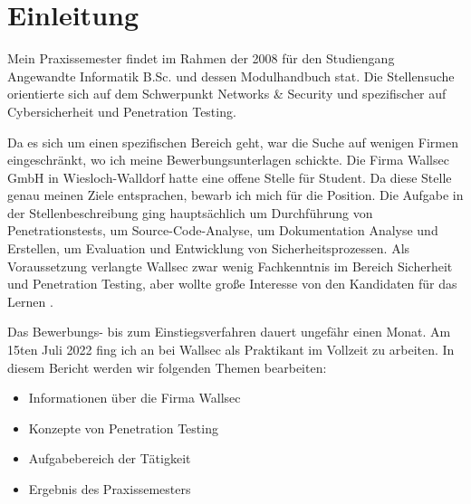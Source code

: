 \section{Einleitung}


Mein Praxissemester findet im Rahmen der  2008 für den Studiengang Angewandte Informatik B.Sc. und dessen Modulhandbuch \citep{Hochschule_Worms_FPO} stat. Die Stellensuche orientierte sich auf dem Schwerpunkt Networks \& Security und spezifischer auf Cybersicherheit und Penetration Testing. 

Da es sich um einen spezifischen Bereich geht, war die Suche auf wenigen Firmen eingeschränkt, wo ich meine Bewerbungsunterlagen schickte. Die Firma Wallsec GmbH in Wiesloch-Walldorf hatte eine offene Stelle für Student. Da diese Stelle genau meinen Ziele entsprachen, bewarb ich mich für die Position. Die Aufgabe in der Stellenbeschreibung ging hauptsächlich um Durchführung von Penetrationstests, um Source-Code-Analyse, um Dokumentation Analyse und Erstellen, um Evaluation und Entwicklung von Sicherheitsprozessen. Als Voraussetzung verlangte Wallsec zwar wenig Fachkenntnis im Bereich Sicherheit und Penetration Testing, aber wollte große Interesse von den Kandidaten für das Lernen \citep{Wallsec}.

Das Bewerbungs- bis zum Einstiegsverfahren dauert ungefähr einen Monat. Am 15ten Juli 2022 fing ich an bei Wallsec als Praktikant im Vollzeit zu arbeiten. In diesem Bericht werden wir folgenden Themen bearbeiten:

\begin{itemize}
   \item Informationen über die Firma Wallsec
   \item Konzepte von Penetration Testing
   \item Aufgabebereich der Tätigkeit
   \item Ergebnis des Praxissemesters
\end{itemize}

